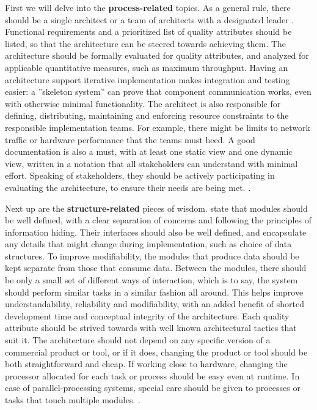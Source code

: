 \documentclass[utf8,english]{gradu3}
\begin{document}
First we will delve into the \textbf{process-related} topics. As a general rule,
there should be a single architect or a team of architects with a designated
leader \parencite[15]{Bass1998}. Functional requirements and a prioritized list
of quality attributes should be listed, so that the architecture can be steered
towards achieving them. The architecture should be formally evaluated for
quality attributes, and analyzed for applicable quantitative measures, such as
maximum throughput. Having an architecture support iterative implementation
makes integration and testing easier: a ''skeleton system'' can prove that
component communication works, even with otherwise minimal functionality. The
architect is also responsible for defining, distributing, maintaining and
enforcing resource constraints to the responsible implementation teams. For
example, there might be limits to network traffic or hardware performance that
the teams must heed. A good documentation is also a must, with at least one
static view and one dynamic view, written in a notation that all stakeholders
can understand with minimal effort. Speaking of stakeholders, they should be
actively participating in evaluating the architecture, to ensure their needs are
being met. \parencite[15]{Bass1998}.

Next up are the \textbf{structure-related} pieces of wisdom.
\textcite[16]{Bass1998} state that modules should be well defined, with a clear
separation of concerns and following the principles of information hiding. Their
interfaces should also be well defined, and encapsulate any details that might
change during implementation, such as choice of data structures. To improve
modifiability, the modules that produce data should be kept separate from those
that consume data. Between the modules, there should be only a small set of
different ways of interaction, which is to say, the system should perform
similar tasks in a similar fashion all around. This helps improve
understandability, reliability and modifiability, with an added benefit of
shorted development time and conceptual integrity of the architecture. Each
quality attribute should be strived towards with well known architectural
tactics that suit it. The architecture should not depend on any specific version
of a commercial product or tool, or if it does, changing the product or tool
should be both straightforward and cheap. If working close to hardware, changing
the processor allocated for each task or process should be easy even at runtime.
In case of parallel-processing systems, special care should be given to
processes or tasks that touch multiple modules. \parencite[16]{Bass1998}.
\end{document}
